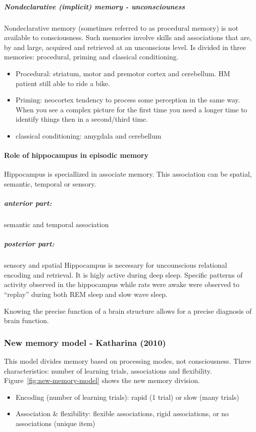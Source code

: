 \documentclass[12pt,article,oneside,a4paper]{memoir}
\begin{document}
\subparagraph{Nondeclarative (implicit) memory - unconsciouness}
Nondeclarative memory (sometimes referred to as procedural memory) is not
available to consciousness. Such memories involve skills and associations 
that are, by and large, acquired and retrieved at an unconscious level.
Is divided in three memories: procedural, priming and classical conditioning.
\begin{itemize}
\item Procedural: striatum, motor and premotor cortex and cerebellum.
\subitem HM patient still able to ride a bike.
\item Priming: neocortex
\subitem tendency to process some perception in the same way. When you see a complex
picture for the first time you need a longer time to identify things then in a 
second/third time.
\item classical conditioning: amygdala and cerebellum
\end{itemize}

\paragraph{Role of hippocampus in episodic memory} 
Hippocampus is speciallized in associate memory. This association can be spatial,
semantic, temporal or sensory.
\subparagraph{anterior part:} semantic and temporal association
\subparagraph{posterior part:} sensory and spatial
Hippocampus is necessary for uncounscious relational encoding and retrieval.
It is higly active during deep sleep. Specific patterns of activity observed in
the hippocampus while rats were awake were observed to “replay” during both REM
sleep and slow wave sleep.

Knowing the precise function of a brain structure allows for a precise diagnosis
of brain function.

\subsubsection{New memory model - Katharina (2010)}
This model divides memory based on processing modes, not consciousness.
Three characteristics: number of learning trials, associations and flexibility.
Figure~\ref{fig:new-memory-model} shows the new memory division.
\begin{itemize}
\item Encoding (number of learning trials): rapid (1 trial) or slow (many trials)
\item Association \& flexibility: flexible associations, rigid associations, or
no associations (unique item) 
\end{itemize}
\end{document}
